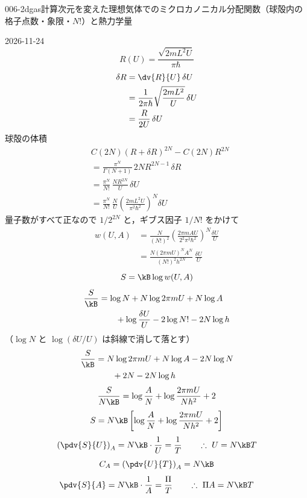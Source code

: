 \documentclass[uplatex,dvipdfmx,a4paper,11pt]{jsarticle}
\begin{document}
\begin{mondai}{006-2dgas}{計算}{次元を変えた理想気体でのミクロカノニカル分配関数（球殻内の格子点数・象限・$N!$）と熱力学量}
\begin{kotaeutsushi}{2026-11-24}
\[ R(U)=\frac{\sqrt{2mL^{2}U}}{\pi\hbar} \]
\begin{align*}
\delta R&=\dv{R}{U}\,\delta U\\
&=\frac{1}{2\pi\hbar}\sqrt{\frac{2mL^{2}}{U}}\,\delta U\\
&=\frac{R}{2U}\,\delta U
\end{align*}
球殻の体積
\begin{align*}
&C(2N)(R+\delta R)^{2N}-C(2N)R^{2N}\\
&=\frac{\pi^{N}}{\Gamma(N+1)}\,2NR^{2N-1}\,\delta R\\
&=\frac{\pi^{N}}{N!}\,\frac{NR^{2N}}{U}\,\delta U\\
&=\frac{\pi^{N}}{N!}\,\frac{N}{U}\left(\frac{2mL^{2}U}{\pi^{2}\hbar^{2}}\right)^{N}\delta U
\end{align*}
量子数がすべて正なので $1/2^{2N}$ と，ギブス因子 $1/N!$ をかけて
\begin{align*}
w(U,A)&=\frac{N}{(N!)^{2}}\left(\frac{2\pi mAU}{2^{2}\pi^{2}\hbar^{2}}\right)^{N}\frac{\delta U}{U}\\
&=\frac{N(2\pi mU)^{N}A^{N}}{(N!)^{2}h^{2N}}\,\frac{\delta U}{U}
\end{align*}
\[ S=\kB\log w(U,A) \]
\begin{align*}
\frac{S}{\kB}&=\log N+N\log2\pi mU+N\log A\\
&\qquad+\log\frac{\delta U}{U}-2\log N!-2N\log h
\end{align*}
（$\log N$ と $\log(\delta U/U)$ は斜線で消して落とす）
\begin{align*}
\frac{S}{\kB}&=N\log2\pi mU+N\log A-2N\log N\\
&\qquad+2N-2N\log h
\end{align*}
\[ \frac{S}{N\kB}=\log\frac{A}{N}+\log\frac{2\pi mU}{Nh^{2}}+2 \]
\[ S=N\kB\left[\log\frac{A}{N}+\log\frac{2\pi mU}{Nh^{2}}+2\right] \]
\[ \left(\pdv{S}{U}\right)_{A}=N\kB\cdot\frac{1}{U}=\frac{1}{T}\qquad\therefore\ U=N\kB T \]
\[ C_{A}=\left(\pdv{U}{T}\right)_{A}=N\kB \]
\[ \pdv{S}{A}=N\kB\cdot\frac{1}{A}=\frac{\Pi}{T}\qquad\therefore\ \Pi A=N\kB T \]
\end{kotaeutsushi}
\end{mondai}

\noteowari
\end{document}
